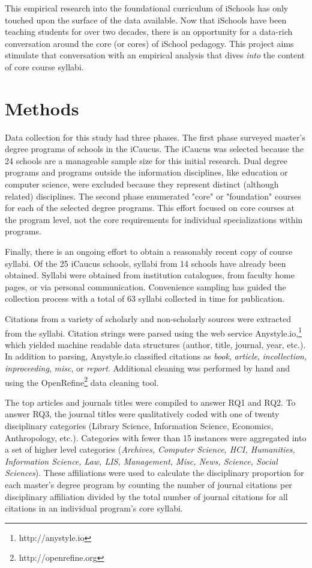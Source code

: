 \documentclass[10pt, letterpaper]{article}
\begin{document}
This empirical research into the foundational curriculum of iSchools has only touched upon the surface of the data available. Now that iSchools have been teaching students for over two decades, there is an opportunity for a data-rich conversation around the core (or cores) of iSchool pedagogy. This project aims stimulate that conversation with an empirical analysis that dives \textit{into} the content of core course syllabi. 

\section{Methods}
Data collection for this study had three phases. The first phase surveyed master's degree programs of schools in the iCaucus. The iCaucus was selected because the 24 schools are a manageable sample size for this initial research. Dual degree programs and programs outside the information disciplines, like education or computer science, were excluded because they represent distinct (although related) disciplines. The second phase enumerated "core" or "foundation" courses for each of the selected degree programs. This effort focused on core courses at the program level, not the core requirements for individual specializations within programs. 

Finally, there is an ongoing effort to obtain a reasonably recent copy of course syllabi. Of the 25 iCaucus schools, syllabi from 14 schools have already been obtained. Syllabi were obtained from institution catalogues, from faculty home pages, or via personal communication. Convenience sampling has guided the collection process with a total of 63 syllabi collected in time for publication.

Citations from a variety of scholarly and non-scholarly sources were extracted from the syllabi. Citation strings were parsed using the web service Anystyle.io,\footnote{http://anystyle.io} which yielded machine readable data structures (author, title, journal, year, etc.). In addition to parsing, Anystyle.io classified citations as \textit{book}, \textit{article}, \textit{incollection}, \textit{inproceeding}, \textit{misc}, or \textit{report}. Additional cleaning was performed by hand and using the OpenRefine\footnote{http://openrefine.org} data cleaning tool.

The top articles and journals titles were compiled to answer RQ1 and RQ2. To answer RQ3, the journal titles were qualitatively coded with one of twenty disciplinary categories (Library Science, Information Science, Economics, Anthropology, etc.). Categories with fewer than 15 instances were aggregated into a set of higher level categories (\textit{Archives, Computer Science, HCI, Humanities, Information Science, Law, LIS, Management, Misc, News, Science, Social Sciences}). These affiliations were used to calculate the disciplinary proportion for each master's degree program by counting the number of journal citations per disciplinary affiliation divided by the total number of journal citations for all citations in an individual program's core syllabi.
\end{document}
